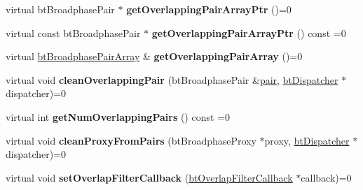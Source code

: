 \begin{DoxyCompactItemize}
\item 
\hypertarget{classbt_overlapping_pair_cache_a86f4b7575c0af1b378de5bd31fdaa0a2}{virtual bt\+Broadphase\+Pair $\ast$ {\bfseries get\+Overlapping\+Pair\+Array\+Ptr} ()=0}\label{classbt_overlapping_pair_cache_a86f4b7575c0af1b378de5bd31fdaa0a2}

\item 
\hypertarget{classbt_overlapping_pair_cache_a87c26afd7caa9a824ed3729465bde1c2}{virtual const bt\+Broadphase\+Pair $\ast$ {\bfseries get\+Overlapping\+Pair\+Array\+Ptr} () const =0}\label{classbt_overlapping_pair_cache_a87c26afd7caa9a824ed3729465bde1c2}

\item 
\hypertarget{classbt_overlapping_pair_cache_af1df94277b6d316b63dc0f52ac672c69}{virtual \hyperlink{classbt_aligned_object_array}{bt\+Broadphase\+Pair\+Array} \& {\bfseries get\+Overlapping\+Pair\+Array} ()=0}\label{classbt_overlapping_pair_cache_af1df94277b6d316b63dc0f52ac672c69}

\item 
\hypertarget{classbt_overlapping_pair_cache_ab0f4a8fc8c59108b5009d0a8b1f59cf5}{virtual void {\bfseries clean\+Overlapping\+Pair} (bt\+Broadphase\+Pair \&\hyperlink{structpair}{pair}, \hyperlink{classbt_dispatcher}{bt\+Dispatcher} $\ast$dispatcher)=0}\label{classbt_overlapping_pair_cache_ab0f4a8fc8c59108b5009d0a8b1f59cf5}

\item 
\hypertarget{classbt_overlapping_pair_cache_a1891ba8fa73578f6d07aa9a67abcdb96}{virtual int {\bfseries get\+Num\+Overlapping\+Pairs} () const =0}\label{classbt_overlapping_pair_cache_a1891ba8fa73578f6d07aa9a67abcdb96}

\item 
\hypertarget{classbt_overlapping_pair_cache_a31a0b857f0eb4e2484be6dcc468a6d36}{virtual void {\bfseries clean\+Proxy\+From\+Pairs} (bt\+Broadphase\+Proxy $\ast$proxy, \hyperlink{classbt_dispatcher}{bt\+Dispatcher} $\ast$dispatcher)=0}\label{classbt_overlapping_pair_cache_a31a0b857f0eb4e2484be6dcc468a6d36}

\item 
\hypertarget{classbt_overlapping_pair_cache_a397db584fa4dbec851447d3911507509}{virtual void {\bfseries set\+Overlap\+Filter\+Callback} (\hyperlink{structbt_overlap_filter_callback}{bt\+Overlap\+Filter\+Callback} $\ast$callback)=0}\label{classbt_overlapping_pair_cache_a397db584fa4dbec851447d3911507509}


\end{DoxyCompactItemize}
